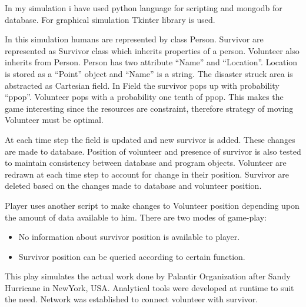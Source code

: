\documentclass[AER]{AEA}
\begin{document}
In my simulation i have used python language for scripting and mongodb for database. For graphical simulation  Tkinter library is used. 


In this simulation humans are represented by class Person. Survivor are represented as Survivor class which inherits properties of a person. Volunteer also inherits from Person. Person has two attribute “Name” and “Location”. Location is stored as a “Point” object and “Name” is a string.
The disaster struck area is abstracted as Cartesian field. In Field the survivor pops up with probability “ppop”. Volunteer pops with a probability one tenth of ppop. This makes the game interesting since the resources are constraint, therefore strategy of moving Volunteer must be optimal.

At each time step the field is updated and new survivor is added. These changes are made to database. Position of volunteer and presence of survivor is also tested to maintain consistency between database and program objects. Volunteer are redrawn at each time step to account for change in their position. Survivor are deleted based on the changes made to database and volunteer position.

Player uses another script to make changes to Volunteer position depending upon the amount of data available to him. There are two modes of game-play:
\begin{itemize}
\item
 No information about survivor position is available to player.
\item
Survivor position can be queried according to certain function.
\end{itemize}
This play simulates the actual work done by Palantir Organization after Sandy Hurricane in NewYork, USA. Analytical tools were developed at runtime to suit the need. Network was established to connect volunteer with survivor.
\end{document}
